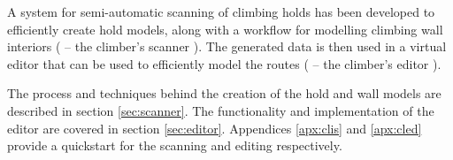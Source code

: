 A system for semi-automatic scanning of climbing holds has been developed to efficiently create hold models, along with a workflow for modelling climbing wall interiors (\raisebox{-0.08em}{} -- the climber's scanner \cite{clis}).
The generated data is then used in a virtual editor that can be used to efficiently model the routes (\raisebox{-0.08em}{} -- the climber's editor \cite{cled}).

The process and techniques behind the creation of the hold and wall models are described in section \ref{sec:scanner}.
The functionality and implementation of the editor are covered in section \ref{sec:editor}.
Appendices \ref{apx:clis} and \ref{apx:cled} provide a quickstart for the scanning and editing respectively.
